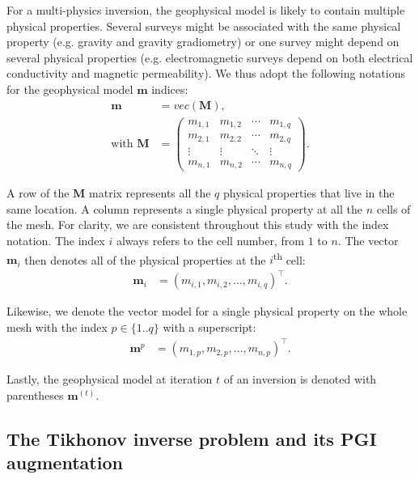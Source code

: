 \documentclass[extra, mreferee]{gji_joint} %
\begin{document}
For a multi-physics inversion, the geophysical model is likely to contain multiple physical properties. Several surveys might be associated with the same physical property (e.g. gravity and gravity gradiometry) or one survey might depend on several physical properties (e.g. electromagnetic surveys depend on both electrical conductivity and magnetic permeability). We thus adopt the following notations for the geophysical model $\mathbf{m}$ indices:
\begin{align}
\mathbf{m} &= vec(\mathbf{M}), \\
\text{with } \mathbf{M} &=
 \begin{pmatrix}
 m_{1, 1} & m_{1, 2} & \cdots & m_{1, q} \\
 m_{2, 1} & m_{2, 2} & \cdots & m_{2, q} \\
 \vdots & \vdots & \ddots & \vdots \\
 m_{n, 1} & m_{n, 2} & \cdots & m_{n, q}
 \end{pmatrix}
\label{m_convention_1}.
\end{align}

A row of the $\mathbf{M}$ matrix represents all the $q$ physical properties that live in the same location. A column represents a single physical property at all the $n$ cells of the mesh. For clarity, we are consistent throughout this study with the index notation. The index $i$ always refers to the cell number, from $1$ to $n$. The vector $\mathbf{m}_i$ then denotes all of the physical properties at the $i$\textsuperscript{th} cell:
\begin{align}
\mathbf{m}_i &= (m_{i, 1}, m_{i, 2}, \dotsc, m_{i, q})^\top.
\label{m_convention_2}
\end{align}

Likewise, we denote the vector model for a single physical property on the whole mesh with the index $p \in \{1..q\}$ with a superscript:
\begin{align}
\mathbf{m}^p &= (m_{1, p}, m_{2, p}, \dotsc, m_{n, p})^\top.
\label{m_convention_3}
\end{align}

Lastly, the geophysical model at iteration $t$ of an inversion is denoted with parentheses $\mathbf{m}^{(t)}$.

\subsection{The Tikhonov inverse problem and its PGI augmentation} \label{section:tik}
\end{document}
